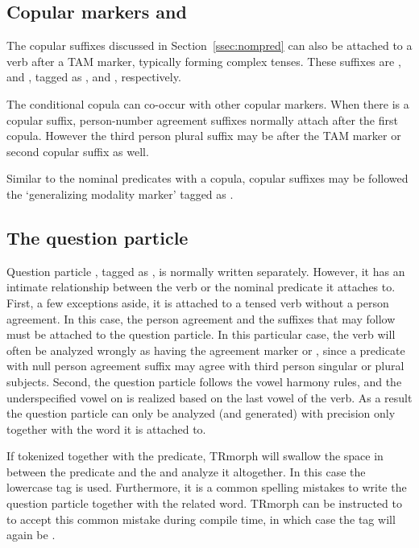 \documentclass[twocolumn]{article}
\begin{document}

\subsection{\label{ssec:verbal-copula}Copular markers and }

The copular suffixes discussed in Section~\ref{ssec:nompred} can also
be attached to a verb after a TAM marker, typically forming complex tenses. These
suffixes are ,  and , tagged as
,
 and
, respectively.

The conditional copula  can co-occur with other copular
markers. When there is a copular suffix, person-number agreement suffixes
normally attach after the first copula. However the third person
plural suffix may be after the TAM marker or second copular suffix as
well.

Similar to the nominal predicates with a copula, copular suffixes may
be followed the `generalizing modality marker'  tagged as
.

\subsection{\label{ssec:question}The question particle}

Question particle , tagged as , is normally
written separately. However, it has an intimate relationship between
the verb or the nominal predicate it attaches to. First, a few
exceptions aside, it is attached to a tensed verb without a person
agreement. In this case, the person agreement and the suffixes that
may follow must be attached to the question particle. In this
particular case, the verb will often be analyzed wrongly as having the
agreement marker  or , since a predicate with null
person agreement suffix may agree with third person singular or plural
subjects. Second, the question particle follows the vowel harmony
rules, and the underspecified vowel on  is realized based on
the last vowel of the verb.  As a result the question particle can
only be analyzed (and generated) with precision only together with the
word it is attached to.

If tokenized together with the predicate, TRmorph will swallow the
space in between the predicate and the  and analyze it
altogether. In this case the lowercase tag  is used.
Furthermore, it is a common spelling mistakes to write the question
particle together with the related word. TRmorph can be instructed to to
accept this common mistake during compile time, in which case the tag
will again be .
\end{document}
